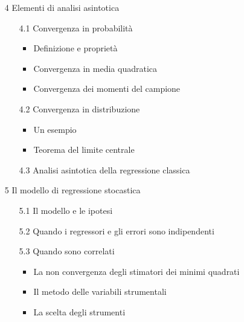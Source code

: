 \documentclass[a4paper,12pt]{article}
\begin{document}
\begin{enumerate}
\item[4] Elementi di analisi asintotica

\begin{enumerate}
\item[4.1] Convergenza in probabilit\`{a}

\begin{itemize}
\item Definizione e propriet\`{a}

\item Convergenza in media quadratica

\item Convergenza dei momenti del campione
\end{itemize}

\item[4.2] Convergenza in distribuzione

\begin{itemize}
\item Un esempio

\item Teorema del limite centrale
\end{itemize}

\item[4.3] Analisi asintotica della regressione classica
\end{enumerate}

\item[5] Il modello di regressione stocastica

\begin{enumerate}
\item[5.1] Il modello e le ipotesi

\item[5.2] Quando i regressori e gli errori sono indipendenti

\item[5.3] Quando sono correlati

\begin{itemize}
\item La non convergenza degli stimatori dei minimi quadrati

\item Il metodo delle variabili strumentali

\item La scelta degli strumenti
\end{itemize}
\end{enumerate}
\end{enumerate}
\end{document}
